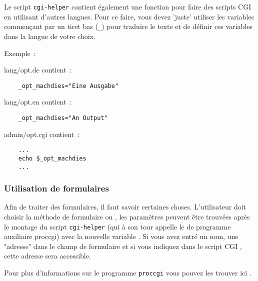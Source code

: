 Le script \texttt{cgi-helper} contient également une fonction pour faire des scripts CGI en
utilisant d'autres langues. Pour ce faire, vous devez 'juste' utiliser les variables
commençant par un tiret bas (\texttt{\_}) pour traduire le texte et de définir ces variables
dans la langue de votre choix.

Exemple~:

lang/opt.de contient~:

\begin{example}
\begin{verbatim}
    _opt_machdies="Eine Ausgabe"
\end{verbatim}
\end{example}

lang/opt.en contient~:

\begin{example}
\begin{verbatim}
    _opt_machdies="An Output"
\end{verbatim}
\end{example}

admin/opt.cgi contient~:

\begin{example}
\begin{verbatim}
    ...
    echo $_opt_machdies
    ...
\end{verbatim}
\end{example}


\subsubsection{Utilisation de formulaires}

Afin de traiter des formulaires, il faut savoir certaines choses. L’utilisateur
doit choisir la méthode de formulaire  ou , les paramètres peuvent
être trouvées après le montage du script \texttt{cgi-helper} (qui à son tour appelle le
de programme auxiliaire proccgi) avec la nouvelle variable .
Si vous avez entré un nom, une "adresse" dans le champ de formulaire et si vous indiquez
dans le script CGI , cette adresse sera accessible.

Pour plus d'informations sur le programme \texttt{proccgi} vous pouvez les trouver ici
.



